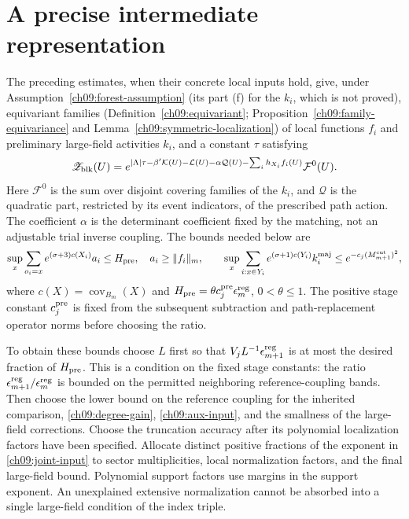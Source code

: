 \section{A precise intermediate representation}
\label{ch09:preparatory}

The preceding estimates, when their concrete local inputs
hold, give, under Assumption~\ref{ch09:forest-assumption} (its part (f) for the $k_i$, which is not proved), equivariant families (Definition~\ref{ch09:equivariant}; Proposition~\ref{ch09:family-equivariance} and Lemma~\ref{ch09:symmetric-localization}) of local functions $f_i$ and preliminary large-field
activities $k_i$, and a constant $\tau$ satisfying
\begin{equation}
 \mathscr Z_{\rm blk}(U)=
 e^{|\Lambda|\tau-\beta'\mathcal K(U)-\mathcal L(U)
                       -\alpha\mathcal Q(U)-\sum_i h_{X_i}f_i(U)}
                         \mathcal F^0(U).
 \label{ch09:early}
\end{equation}
Here $\mathcal F^0$ is the sum over disjoint covering families of the $k_i$,
and $\mathcal Q$ is the quadratic part, restricted by its event indicators, of the
prescribed path action. The coefficient $\alpha$ is
the determinant coefficient fixed by the matching, not an adjustable
trial inverse coupling. The bounds needed below are
\begin{equation}
 \sup_x\sum_{o_i=x}e^{(\sigma+3)c(X_i)}a_i\le H_{\rm pre},
 \quad a_i\ge\|f_i\|_m,\qquad
 \sup_x\sum_{i:x\in Y_i}e^{(\sigma+1)c(Y_i)}k_i^{\rm maj}
       \le e^{-c_j(M_{m+1}^{\rm cut})^2},
 \label{ch09:early-bounds}
\end{equation}
where $c(X)=\operatorname{cov}_{B_m}(X)$ and
$H_{\rm pre}=\theta c_j^{\rm pre}\epsilon_m^{\rm reg}$,
$0<\theta\le1$. The positive stage constant $c_j^{\rm pre}$
is fixed from the subsequent subtraction and path-replacement
operator norms before choosing the ratio.

To obtain these bounds choose $L$ first so that
$V_jL^{-1}\epsilon_{m+1}^{\rm reg}$ is at most the desired fraction of
$H_{\rm pre}$. This is a condition on the fixed stage constants:
the ratio $\epsilon_{m+1}^{\rm reg}/\epsilon_m^{\rm reg}$ is bounded
on the permitted neighboring reference-coupling bands.
Then choose the lower bound on the reference coupling for the inherited
comparison, \eqref{ch09:degree-gain},
\eqref{ch09:aux-input}, and the smallness of the large-field corrections.
Choose the truncation accuracy after its polynomial
localization factors have been specified.
Allocate distinct positive fractions of the exponent in
\eqref{ch09:joint-input} to sector multiplicities, local
normalization factors, and the final large-field bound.
Polynomial support factors use margins in the support exponent.
An unexplained extensive normalization cannot be absorbed into
a single large-field condition of the index triple.


